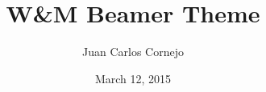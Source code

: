 \documentclass[xcolor=table,compress,pdfpagelabels]{beamer}
\author{Juan Carlos Cornejo}
\title{W\&M Beamer Theme}
\institute{The College of William \& Mary}
\date{March 12, 2015}
\begin{document}
\begin{frame}[plain]
 \titlepage
\end{frame}
\end{document}
